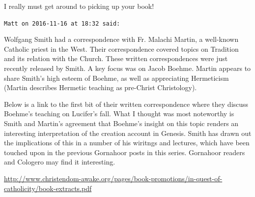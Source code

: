 \begin{footnotesize}
\begin{sffamily}
I really must get around to picking up your book!


\hfill

\texttt{Matt on 2016-11-16 at 18:32 said: }

Wolfgang Smith had a correspondence with Fr. Malachi Martin, a well-known Catholic priest in the West. Their correspondence covered topics on Tradition and its relation with the Church. These written correspondences were just recently released by Smith. A key focus was on Jacob Boehme. Martin appears to share Smith's high esteem of Boehme, as well as appreciating Hermeticism (Martin describes Hermetic teaching as pre-Christ Christology).

Below is a link to the first bit of their written correspondence where they discuss Boehme's teaching on Lucifer's fall. What I thought was most noteworthy is Smith and Martin's agreement that Boehme's insight on this topic renders an interesting interpretation of the creation account in Genesis. Smith has drawn out the implications of this in a number of his wiritngs and lectures, which have been touched upon in the previous Gornahoor posts in this series. Gornahoor readers and Cologero may find it interesting.

\url{http://www.christendom-awake.org/pages/book-promotions/in-quest-of-catholicity/book-extracts.pdf}


\end{sffamily}\end{footnotesize}
